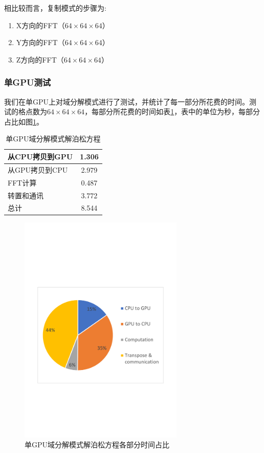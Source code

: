 相比较而言，复制模式的步骤为:
\begin{enumerate}
  \item X方向的FFT（$64 \times 64 \times 64$）
  \item Y方向的FFT（$64 \times 64 \times 64$）
  \item Z方向的FFT（$64 \times 64 \times 64$）
\end{enumerate}
\subsubsection{单GPU测试}
我们在单GPU上对域分解模式进行了测试，并统计了每一部分所花费的时间。测试的格点数为$64 \times 64 \times 64$，每部分所花费的时间如表\ref{tab:1GPU_Poisson}，表中的单位为秒，每部分占比如图\ref{fig:1GPU_Poisson}。

\begin{table}[!htbp]
    \centering
    \footnotesize%
    \setlength{\tabcolsep}{4pt}%
    \renewcommand{\arraystretch}{1.2}%
    \begin{tabular}{lc}
        \hline\hline
        从CPU拷贝到GPU    & 1.306     \\
        \hline
        从GPU拷贝到CPU    & 2.979     \\
        \hline
        FFT计算           & 0.487     \\
        \hline
        转置和通讯        & 3.772     \\
        \hline
        总计              & 8.544    \\
        \hline\hline
    \end{tabular}
    \caption{单GPU域分解模式解泊松方程}
    \label{tab:1GPU_Poisson}
\end{table}

\begin{figure}[!htb]
    \centering
    \includegraphics[width=0.7\textwidth]{Img/domain_decomposition_1GPU.pdf}
    \caption{单GPU域分解模式解泊松方程各部分时间占比}\label{fig:1GPU_Poisson}
\end{figure}

